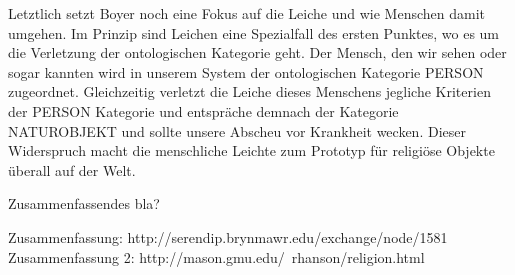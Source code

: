 Letztlich setzt Boyer noch eine Fokus auf die Leiche und wie Menschen damit umgehen. Im Prinzip sind Leichen eine Spezialfall des ersten Punktes, wo es um die Verletzung der ontologischen Kategorie geht. Der Mensch, den wir sehen oder sogar kannten wird in unserem System der ontologischen Kategorie PERSON zugeordnet. Gleichzeitig verletzt die Leiche dieses Menschens jegliche Kriterien der PERSON Kategorie und entspräche demnach der Kategorie NATUROBJEKT und sollte unsere Abscheu vor Krankheit wecken. Dieser Widerspruch macht die menschliche Leichte zum Prototyp für religiöse Objekte überall auf der Welt.

\smallskip
Zusammenfassendes bla?

Zusammenfassung: http://serendip.brynmawr.edu/exchange/node/1581
Zusammenfassung 2: http://mason.gmu.edu/~rhanson/religion.html